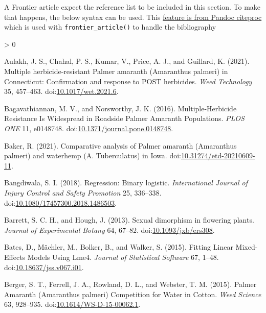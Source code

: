 \documentclass[utf8]{frontiersSCNS}
\newlength{\cslhangindent}
\newenvironment{CSLReferences}[2] %
 {%
  \setlength{\parindent}{0pt}
  \ifodd #1 \everypar{\setlength{\hangindent}{\cslhangindent}}\ignorespaces\fi
  \ifnum #2 > 0
  \setlength{\parskip}{#2\baselineskip}
  \fi
 }%
 {}
\begin{document}
A Frontier article expect the reference list to be included in this
section. To make that happens, the below syntax can be used. This
\href{https://pandoc.org/MANUAL.html\#placement-of-the-bibliography}{feature
is from Pandoc citeproc} which is used with \texttt{frontier\_article()}
to handle the bibliography

\hypertarget{refs}{}
\begin{CSLReferences}{1}{0}
\leavevmode\hypertarget{ref-aulakh2021}{}%
Aulakh, J. S., Chahal, P. S., Kumar, V., Price, A. J., and Guillard, K.
(2021). Multiple herbicide-resistant {Palmer} amaranth ({Amaranthus}
palmeri) in {Connecticut}: Confirmation and response to {POST}
herbicides. \emph{Weed Technology} 35, 457--463.
doi:\href{https://doi.org/10.1017/wet.2021.6}{10.1017/wet.2021.6}.

\leavevmode\hypertarget{ref-bagavathiannan2016}{}%
Bagavathiannan, M. V., and Norsworthy, J. K. (2016). Multiple-{Herbicide
Resistance Is Widespread} in {Roadside Palmer Amaranth Populations}.
\emph{PLOS ONE} 11, e0148748.
doi:\href{https://doi.org/10.1371/journal.pone.0148748}{10.1371/journal.pone.0148748}.

\leavevmode\hypertarget{ref-baker2021}{}%
Baker, R. (2021). Comparative analysis of {Palmer} amaranth
({Amaranthus} palmeri) and waterhemp ({A}. Tuberculatus) in {Iowa}.
doi:\href{https://doi.org/10.31274/etd-20210609-11}{10.31274/etd-20210609-11}.

\leavevmode\hypertarget{ref-bangdiwala2018}{}%
Bangdiwala, S. I. (2018). Regression: Binary logistic.
\emph{International Journal of Injury Control and Safety Promotion} 25,
336--338.
doi:\href{https://doi.org/10.1080/17457300.2018.1486503}{10.1080/17457300.2018.1486503}.

\leavevmode\hypertarget{ref-barrett2013}{}%
Barrett, S. C. H., and Hough, J. (2013). Sexual dimorphism in flowering
plants. \emph{Journal of Experimental Botany} 64, 67--82.
doi:\href{https://doi.org/10.1093/jxb/ers308}{10.1093/jxb/ers308}.

\leavevmode\hypertarget{ref-bates2015}{}%
Bates, D., Mächler, M., Bolker, B., and Walker, S. (2015). Fitting
{Linear Mixed}-{Effects Models Using} Lme4. \emph{Journal of Statistical
Software} 67, 1--48.
doi:\href{https://doi.org/10.18637/jss.v067.i01}{10.18637/jss.v067.i01}.

\leavevmode\hypertarget{ref-berger2015}{}%
Berger, S. T., Ferrell, J. A., Rowland, D. L., and Webster, T. M.
(2015). Palmer {Amaranth} ({Amaranthus} palmeri) {Competition} for
{Water} in {Cotton}. \emph{Weed Science} 63, 928--935.
doi:\href{https://doi.org/10.1614/WS-D-15-00062.1}{10.1614/WS-D-15-00062.1}.


\end{CSLReferences}
\end{document}
